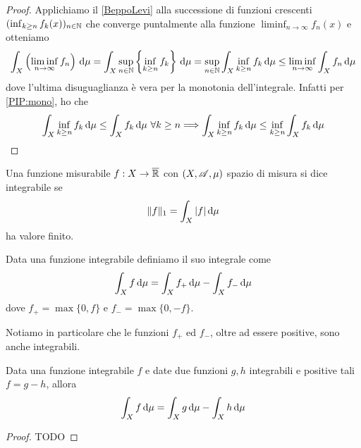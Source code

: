 \begin{proof}
	Applichiamo il \cref{BeppoLevi} alla successione di funzioni crescenti $(\inf_{k\ge n}f_k(x))_{n\in\mathbb N}$ che converge puntalmente alla funzione $\liminf_{n\to\infty}f_n(x)$ e otteniamo
	\begin{equation*}
		\int_X\left(\liminf_{n\to\infty}f_n\right)\,\mathrm d\mu=\int_X \sup_{n\in\mathbb N}\left\{\inf_{k\ge n}f_k\right\}\,\mathrm d\mu=\sup_{n\in\mathbb N}\int_X \inf_{k\ge n}f_k\,\mathrm d\mu\le \liminf_{n\to\infty}\int_Xf_n\,\mathrm d\mu
	\end{equation*}
	dove l'ultima disuguaglianza è vera per la monotonia dell'integrale. Infatti per \cref{PIP:mono}, ho che
	\begin{equation*}
		\int_X \inf_{k\ge n}f_k\,\mathrm d\mu\le \int_Xf_k\,\mathrm d\mu \ \forall k\ge n \Longrightarrow \int_X \inf_{k\ge n}f_k\,\mathrm d\mu\le \inf_{k\ge n}\int_Xf_k\,\mathrm d\mu
	\end{equation*}
\end{proof}

\begin{definition}
	Una funzione misurabile $f:X\to\overline{\mathbb R}$ con $(X,\mathscr A,\mu)$ spazio di misura si dice integrabile se 
	\begin{equation*}
		\Vert f \Vert_1=\int_X |f|\,\mathrm d\mu
	\end{equation*}
	ha valore finito.
	
\end{definition}

\begin{definition}
	Data una funzione integrabile definiamo il suo integrale come
	\begin{equation*}
		\int_X f\,\mathrm d\mu=\int_Xf_+\,\mathrm d\mu-\int_Xf_-\,\mathrm d\mu
	\end{equation*}
	dove $f_+=\max\{0,f\}$ e $f_-=\max\{0,-f\}$.
\end{definition}

\begin{remark}
	Notiamo in particolare che le funzioni $f_+$ ed $f_-$, oltre ad essere positive, sono anche integrabili.
\end{remark}

\begin{lemma}
	Data una funzione integrabile $f$ e date due funzioni $g,h$ integrabili e positive tali $f=g-h$, allora
	\begin{equation*}
		\int_X f\,\mathrm d\mu=\int_Xg\,\mathrm d\mu-\int_Xh\,\mathrm d\mu
	\end{equation*}
\end{lemma}
\begin{proof}
	TODO
\end{proof}

